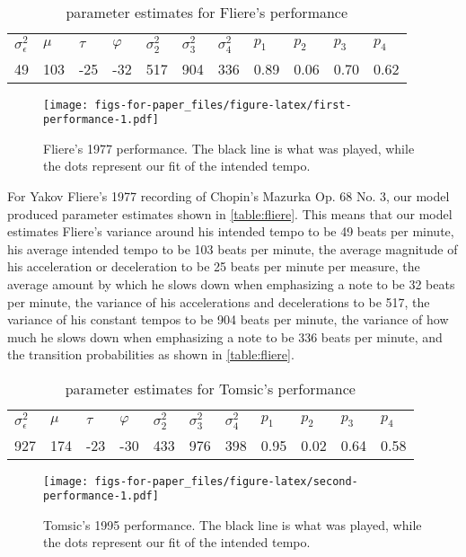 \documentclass[12pt]{article}
\begin{document}
\begin{table}[]
\begin{tabular}{lllllllllll}
$\sigma_\epsilon^2$ & $\mu$ & $\tau$ & $\varphi$ & $\sigma_2^2$ & $\sigma_3^2$ & $\sigma_4^2$ & $p_1$ & $p_2$ & $p_3$ & $p_4$ \\
49 & 103 & -25 & -32 & 517 & 904 & 336 & 0.89 & 0.06 & 0.70 & 0.62\\
\end{tabular}
\caption{parameter estimates for Fliere's performance}
\label{table:fliere}
\end{table}

\begin{figure}
    \texttt{[image: figs-for-paper\_files/figure-latex/first-performance-1.pdf]}
    \caption{Fliere's 1977 performance. The black line is what was played, while the dots represent our fit of the intended tempo.}
    \label{figure:fliere}
\end{figure}

For Yakov Fliere's 1977 recording of Chopin's Mazurka Op. 68 No. 3, our model produced parameter estimates shown in \autoref{table:fliere}. This means that our model estimates Fliere's variance around his intended tempo to be 49 beats per minute, his average intended tempo to be 103 beats per minute, the average magnitude of his acceleration or deceleration to be 25 beats per minute per measure, the average amount by which he slows down when emphasizing a note to be 32 beats per minute, the variance of his accelerations and decelerations to be 517, the variance of his constant tempos to be 904 beats per minute, the variance of how much he slows down when emphasizing a note to be 336 beats per minute, and the transition probabilities as shown in \autoref{table:fliere}.

\begin{table}[]
\begin{tabular}{lllllllllll}
$\sigma_\epsilon^2$ & $\mu$ & $\tau$ & $\varphi$ & $\sigma_2^2$ & $\sigma_3^2$ & $\sigma_4^2$ & $p_1$ & $p_2$ & $p_3$ & $p_4$ \\
927 & 174 & -23 & -30 & 433 & 976 & 398 & 0.95 & 0.02 & 0.64 & 0.58\\
\end{tabular}
\caption{parameter estimates for Tomsic's performance}
\label{table:tomsic}
\end{table}

\begin{figure}
    \texttt{[image: figs-for-paper\_files/figure-latex/second-performance-1.pdf]}
    \caption{Tomsic's 1995 performance. The black line is what was played, while the dots represent our fit of the intended tempo.}
    \label{figure:tomsic}
\end{figure}
\end{document}
